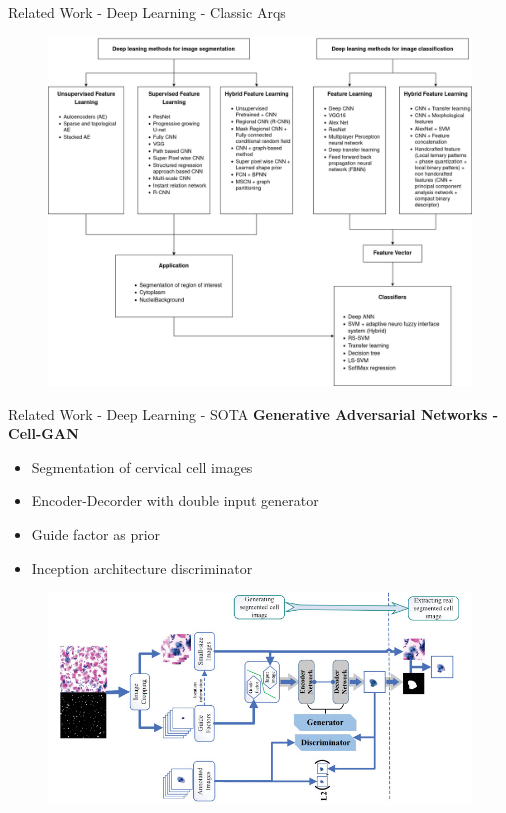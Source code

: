 \documentclass[xcolor=dvipsnames]{beamer}
\begin{document}
    \begin{frame}{Related Work - Deep Learning - Classic Arqs}
       \begin{figure}
           \centering
           \includegraphics[width=0.79\paperwidth]{img/dl-algo.png}
       \end{figure}
    \end{frame}

    \begin{frame}{Related Work - Deep Learning - SOTA}
        \textbf{Generative Adversarial Networks - Cell-GAN~\cite{9513282}}
        \begin{itemize}
            \item Segmentation of cervical cell images
            \item Encoder-Decorder with double input generator
            \item Guide factor as prior
            \item Inception architecture discriminator
        \end{itemize}
        
        \begin{figure}
           \centering
           \includegraphics[width=0.7\paperwidth]{img/yang1-3104609-large.jpg}
       \end{figure}
    \end{frame}
\end{document}
